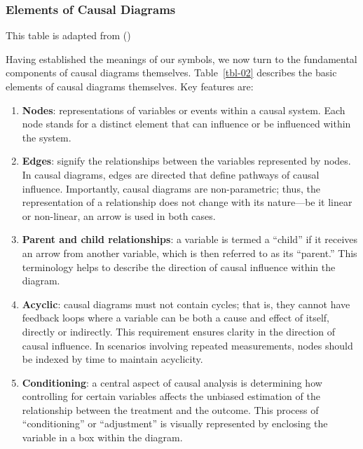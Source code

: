 \documentclass[
  singlecolumn]{article}
\begin{document}
\subsubsection{Elements of Causal
Diagrams}\label{elements-of-causal-diagrams}

\begin{table}

\caption{\label{tbl-03}This table is adapted from
()}

\centering{

\terminologydirectedgraph

}

\end{table}%

Having established the meanings of our symbols, we now turn to the
fundamental components of causal diagrams themselves. Table~\ref{tbl-02}
describes the basic elements of causal diagrams themselves. Key features
are:

\begin{enumerate}
\def\labelenumi{\arabic{enumi}.}
\item
  \textbf{Nodes}: representations of variables or events within a causal
  system. Each node stands for a distinct element that can influence or
  be influenced within the system.
\item
  \textbf{Edges}: signify the relationships between the variables
  represented by nodes. In causal diagrams, edges are directed that
  define pathways of causal influence. Importantly, causal diagrams are
  non-parametric; thus, the representation of a relationship does not
  change with its nature---be it linear or non-linear, an arrow is used
  in both cases.
\item
  \textbf{Parent and child relationships}: a variable is termed a
  ``child'' if it receives an arrow from another variable, which is then
  referred to as its ``parent.'' This terminology helps to describe the
  direction of causal influence within the diagram.
\item
  \textbf{Acyclic}: causal diagrams must not contain cycles; that is,
  they cannot have feedback loops where a variable can be both a cause
  and effect of itself, directly or indirectly. This requirement ensures
  clarity in the direction of causal influence. In scenarios involving
  repeated measurements, nodes should be indexed by time to maintain
  acyclicity.
\item
  \textbf{Conditioning}: a central aspect of causal analysis is
  determining how controlling for certain variables affects the unbiased
  estimation of the relationship between the treatment and the outcome.
  This process of ``conditioning'' or ``adjustment'' is visually
  represented by enclosing the variable in a box within the diagram.
\end{enumerate}
\end{document}
